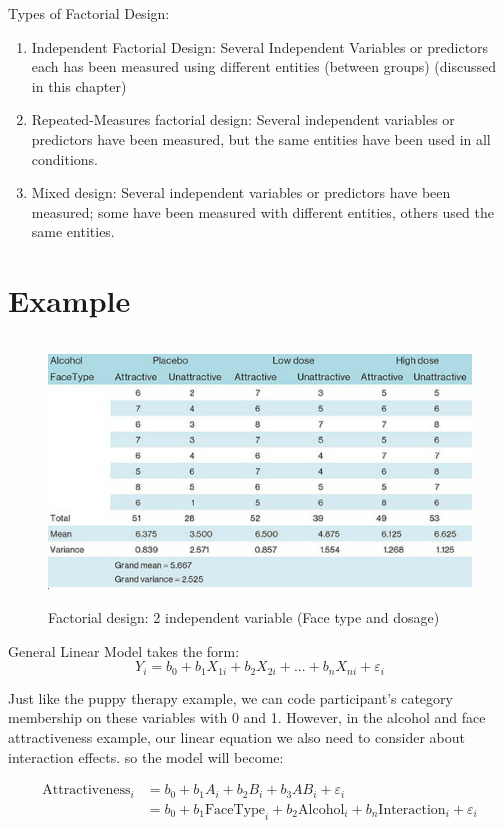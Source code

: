 Types of Factorial Design:
\begin{enumerate}
\item Independent Factorial Design: Several Independent Variables or predictors each has been measured using different entities (between groups) (discussed in this chapter)
\item Repeated-Measures factorial design: Several independent variables or predictors have been measured, but the same entities have been used in all conditions. 
\item Mixed design: Several independent variables or predictors have been measured; some have been measured with different entities, others used the same entities.
\end{enumerate}

\section{Example}
\begin{figure}[h]
	\includegraphics[width=1\textwidth,height=70mm]{Chapter 14 GLM 3 Factorial Designs/beergoggleeffect.PNG}
	\caption{Factorial design: 2 independent variable (Face type and dosage) }
\end{figure}


General Linear Model takes the form:
\begin{equation}
Y_i = b_0 + b_1X_{1i} + b_2X_{2i} + ...+ b_nX_{ni} + \varepsilon_i
\end{equation}

Just like the puppy therapy example, we can code participant's category membership on these variables with 0 and 1. 
However, in the alcohol and face attractiveness example, our linear equation we also need to consider about interaction effects. so the model will become:

\begin{equation}
\begin{split}
\text{Attractiveness}_i & = b_0 + b_1A_{i} + b_2B_{i} + b_3AB_{i} + \varepsilon_i \\
& = b_0 + b_1\text{FaceType}_{i} + b_2\text{Alcohol}_{i} + b_n\text{Interaction}_{i} + \varepsilon_i
\end{split}
\end{equation}

